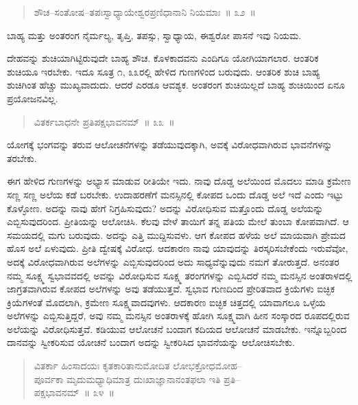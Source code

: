\vspace{-0.3cm}

\begin{verse}
ಶೌಚ–ಸಂತೋಷ–ತಪಃಸ್ವಾಧ್ಯಾಯೇಶ್ವರಪ್ರಣಿಧಾನಾನಿ ನಿಯಮಾಃ~॥ ೩೨~॥
\end{verse}

\vspace{-0.3cm}

ಬಾಹ್ಯ ಮತ್ತು ಅಂತರಂಗ ನೈರ್ಮಲ್ಯ, ತೃಪ್ತಿ, ತಪಸ್ಸು, ಸ್ವಾಧ್ಯಾಯ, ಈಶ್ವರೋ ಪಾಸನೆ ಇವು ನಿಯಮ. 

ದೇಹವನ್ನು ಶುಚಿಯಾಗಿಟ್ಟಿರುವುದೇ ಬಾಹ್ಯ ಶೌಚ. ಕೊಳಕಾದವನು ಎಂದಿಗೂ ಯೋಗಿಯಾಗಲಾರ. ಆಂತರಿಕ ಶುಚಿಯೂ ಇರಬೇಕು. ಇದೂ ಸೂತ್ರ ೧, ೩೩ರಲ್ಲಿ ಹೇಳಿದ ಗುಣಗಳಿಂದ ಬರುವುದು. ಆಂತರಿಕ ಶುಚಿ ಬಾಹ್ಯ ಶುಚಿಗಿಂತ ಹೆಚ್ಚು ಮುಖ್ಯವಾದುದು. ಆದರೆ ಎರಡೂ ಆವಶ್ಯಕ. ಅಂತರಂಗ ಶುಚಿಯಿಲ್ಲದೆ ಬಾಹ್ಯ ಶುಚಿಯಿಂದ ಏನೂ ಪ್ರಯೋಜನವಿಲ್ಲ. 

\vspace{-0.3cm}

\begin{verse}
ವಿತರ್ಕಬಾಧನೇ ಪ್ರತಿಪಕ್ಷಭಾವನಮ್​~॥ ೩೩~॥
\end{verse}

\vspace{-0.3cm}

ಯೋಗಕ್ಕೆ ಭಂಗವನ್ನು ತರುವ ಆಲೋಚನೆಗಳನ್ನು ತಡೆಯುವುದಕ್ಕಾಗಿ, ಅವಕ್ಕೆ ವಿರೋಧವಾಗಿರುವ ಭಾವನೆಗಳನ್ನು ತರಬೇಕು. 

ಈಗ ಹೇಳಿದ ಗುಣಗಳನ್ನು ಅಭ್ಯಾಸ ಮಾಡುವ ರೀತಿಯೇ ಇದು. ನಾವು ದೊಡ್ಡ ಅಲೆಯಿಂದ ಮೊದಲು ಮಾಡಿ ಕ್ರಮೇಣ ಸಣ್ಣ ಸಣ್ಣ ಅಲೆಯ ಕಡೆ ಬರಬೇಕು. ಉದಾಹರಣೆಗೆ ಮನಸ್ಸಿನಲ್ಲಿ ಕೋಪದ ಒಂದು ದೊಡ್ಡ ಅಲೆ ಇದೆ ಎಂದು ಇಟ್ಟು ಕೊಳ್ಳೋಣ. ಅದನ್ನು ನಾವು ಹೇಗೆ ನಿಗ್ರಹಿಸುವುದು? ಅದನ್ನು ವಿರೋಧಿಸುವ ಮತ್ತೊಂದು ದೊಡ್ಡ ಅಲೆಯನ್ನು ಎಬ್ಬಿಸುವುದರಿಂದ. ಪ್ರೀತಿಯನ್ನು ಆಲೋಚಿಸಿ. ಕೆಲವು ವೇಳೆ ತಾಯಿಗೆ ತನ್ನ ಪತಿಯ ಮೇಲೆ ತುಂಬಾ ಕೋಪವಾಗಿದೆ. ಆ ಸಮಯದಲ್ಲಿ ಮಗು ಬರುವುದು. ಅದನ್ನು ಎತ್ತಿ ಮುದ್ದಿಸುವಳು. ಆಗ ಕೋಪದ ಹಳೆಯ ಅಲೆ ಮಾಯವಾಗಿ ಪ್ರೇಮದ ಹೊಸ ಅಲೆ ಏಳುವುದು. ಪ್ರೀತಿ ದ್ವೇಷಕ್ಕೆ ವಿರೋಧ. ಆದಕಾರಣ ನಾವು ಯಾವುದನ್ನು ತಿರಸ್ಕರಿಸಬೇಕೆಂದು ಇರುವೆವೋ, ಅದಕ್ಕೆ ವಿರೋಧವಾಗಿರುವ ಅಲೆಗಳನ್ನು ಎಬ್ಬಿಸುವುದರಿಂದ ಅದು ಸಾಧ್ಯವೆನ್ನುವುದು ನಮಗೆ ತೋರುತ್ತದೆ. ಅನಂತರ ನಮ್ಮ ಸೂಕ್ಷ್ಮ ಸ್ವಭಾವವದಲ್ಲಿ ಅವನ್ನು ವಿರೋಧಿಸುವ ಸೂಕ್ಷ್ಮ ತರಂಗಗಳನ್ನು ಎಬ್ಬಿಸಿದರೆ ನಮ್ಮ ಮನಸ್ಸಿನ ಅಂತರಾಳದಲ್ಲಿ ಜಾಗ್ರತವಾಗಿರುವ ಕೋಪದ ಅಲೆಗಳನ್ನು ಅವು ತಡೆಯುತ್ತವೆ. ಸ್ವಭಾವ ಗುಣದಿಂದ ಪ್ರೇರಿತವಾದ ಕ್ರಿಯೆಗಳು ಐಚ್ಛಿಕ ಕ್ರಿಯೆಗಳಂತೆ ಮೊದಲಾಗಿ, ಕ್ರಮೇಣ ಸೂಕ್ಷ್ಮವಾದವುಗಳು. ಆದಕಾರಣ ಐಚ್ಛಿಕ ಚಿತ್ತದಲ್ಲಿ ಯಾವಾಗಲೂ ಒಳ್ಳೆಯ ಅಲೆಗಳನ್ನು ಎಬ್ಬಿಸುತ್ತಿದ್ದರೆ, ಅವು ನಮ್ಮ ಮನಸ್ಸಿನ ಅಂತರಾಳಕ್ಕೆ ಹೋಗಿ ಸೂಕ್ಷ್ಮವಾಗಿ ಹೀನ ಸಂಸ್ಕಾರದ ರೂಪದಲ್ಲಿರುವ ಅಲೆಯನ್ನು ವಿರೋಧಿಸುತ್ತವೆ. ಕಡಿಯುವ ಆಲೋಚನೆ ಬಂದಾಗ ಕದಿಯದ ಆಲೋಚನೆ ಮಾಡಬೇಕು. ಇನ್ನೊಬ್ಬರಿಂದ ದಾನವನ್ನು ಸ್ವೀಕರಿಸುವ ಯೋಚನೆ ಬಂದಾಗ ಅದನ್ನು ಸ್ವೀಕರಿಸಿದ ಭಾವನೆಯನ್ನು ಆಲೋಚಿಸಬೇಕು. 

\vspace{-0.3cm}

\begin{verse}
ವಿತರ್ಕಾ ಹಿಂಸಾದಯಃ ಕೃತಕಾರಿತಾನುಮೋದಿತ ಲೋಭಕ್ರೋಧಮೋಹ–\\ಪೂರ್ವಕಾ ಮೃದುಮಧ್ಯಾಧಿಮಾತ್ರ ದುಃಖಾಜ್ಞಾನಾನಂತಫಲಾ ಇತಿ ಪ್ರತಿ–\\ಪಕ್ಷಭಾವನಮ್​~॥ ೩೪~॥
\end{verse}

